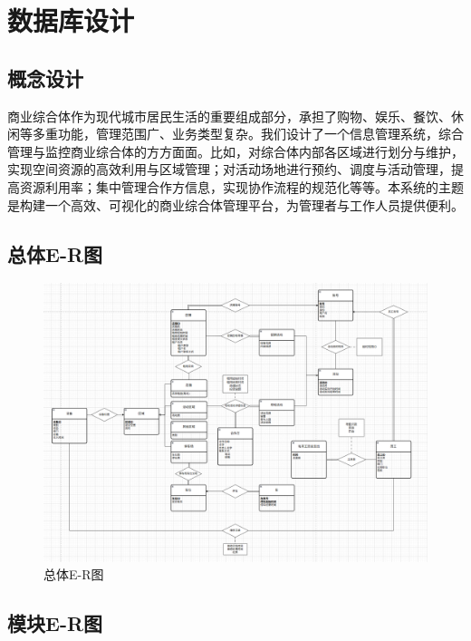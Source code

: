 \documentclass[]{article}
\let\oldincludegraphics\includegraphics
\renewcommand{\includegraphics}[2][]{%
  \begin{center}\oldincludegraphics[#1]{#2}\end{center}%
}
\begin{document}
\hypertarget{ux6570ux636eux5e93ux8bbeux8ba1}{%
\section{数据库设计}\label{ux6570ux636eux5e93ux8bbeux8ba1}}

\hypertarget{ux6982ux5ff5ux8bbeux8ba1}{%
\subsection{概念设计}\label{ux6982ux5ff5ux8bbeux8ba1}}

商业综合体作为现代城市居民生活的重要组成部分，承担了购物、娱乐、餐饮、休闲等多重功能，管理范围广、业务类型复杂。我们设计了一个信息管理系统，综合管理与监控商业综合体的方方面面。比如，对综合体内部各区域进行划分与维护，实现空间资源的高效利用与区域管理；对活动场地进行预约、调度与活动管理，提高资源利用率；集中管理合作方信息，实现协作流程的规范化等等。本系统的主题是构建一个高效、可视化的商业综合体管理平台，为管理者与工作人员提供便利。

\hypertarget{ux603bux4f53e-rux56fe}{%
\subsection{总体E-R图}\label{ux603bux4f53e-rux56fe}}

\begin{figure}[htbp]
\centering
\includegraphics{image1.png}
\caption{总体E-R图}
\end{figure}

\hypertarget{ux6a21ux5757e-rux56fe}{%
\subsection{模块E-R图}\label{ux6a21ux5757e-rux56fe}}
\end{document}
